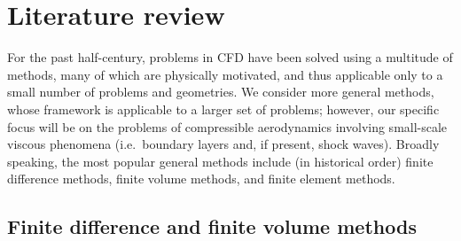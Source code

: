 %

\section{Literature review}

For the past half-century, problems in CFD have been solved using a multitude of methods, many of which are physically motivated, and thus applicable only to a small number of problems and geometries. We consider more general methods, whose framework is applicable to a larger set of problems; however, our specific focus will be on the problems of compressible aerodynamics involving small-scale viscous phenomena (i.e.\ boundary layers and, if present, shock waves). Broadly speaking, the most popular general methods include (in historical order) finite difference methods, finite volume methods, and finite element methods.  

\subsection{Finite difference and finite volume methods}

